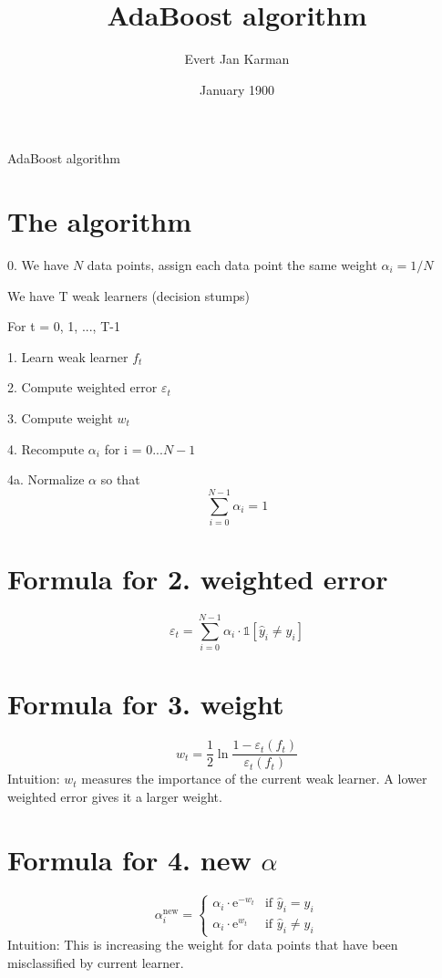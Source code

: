 \documentclass[12pt, letterpaper]{article}
\title{AdaBoost algorithm}
\author{Evert Jan Karman}
\date{January 1900}
\begin{document}
\maketitle

AdaBoost algorithm

\section{The algorithm}
0. We have \(N\) data points, assign each data point the same weight \( \alpha_i = 1 / N\)

{\par\medskip}

We have T weak learners (decision stumps)
{\par\medskip}
For t = 0, 1, ..., T-1
{\par\medskip}
\hspace*{6pt}1. Learn weak learner \(f_t\)
{\par\medskip}
\hspace*{6pt}2. Compute weighted error \( \varepsilon_t \)
{\par\medskip}
\hspace*{6pt}3. Compute weight \(w_t\)
{\par\medskip}
\hspace*{6pt}4. Recompute \(\alpha_i\) for i = 0...\(N-1\)
{\par\medskip}
\hspace*{6pt}4a. Normalize \( \alpha \) so that
\[
\sum_{i=0}^{N-1} \alpha_i = 1
\]

\section{Formula for 2. weighted error}
\[
\varepsilon_t =
\sum_{i=0}^{N-1} \alpha_i \cdot \mathds{1}[\hat{y}_i \ne y_i]
\]


\section{Formula for 3. weight}
\[
w_t =  \frac{1}{2} \ln \frac{1 - \varepsilon_t(f_t)}{\varepsilon_t(f_t)}
\]
Intuition: \(w_t\) measures the importance of the current weak learner. A lower weighted error gives it a larger weight.

\section{Formula for 4. new \(\alpha\)}
\[
\alpha_i^{\text{new}} =
\begin{cases}
\alpha_i \cdot \mathrm{e}^{-w_t} & \text{if } \hat{y}_i = y_i\\
\alpha_i \cdot \mathrm{e}^{w_t} & \text{if } \hat{y}_i \ne y_i
\end{cases}
\]
Intuition: This is increasing the weight for data points that have been misclassified by current learner.
\end{document}
